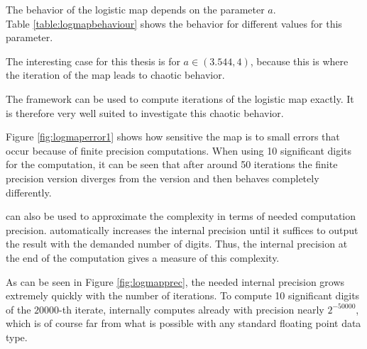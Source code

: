   The behavior of the logistic map depends on the parameter $a$.\\
  Table \ref{table:logmapbehaviour} shows the behavior for different values for this parameter.

  The interesting case for this thesis is for $a \in (3.544, 4)$, because this is  where the iteration of the map leads to chaotic behavior.

  The \irram framework can be used to compute iterations of the logistic map exactly. It is therefore very well suited to investigate this chaotic behavior.
  
  Figure \ref{fig:logmaperror1} shows how sensitive the map is to small errors that occur because of finite precision computations. 
  When using 10 significant digits for the computation, it can be seen that after around 50 iterations the finite precision version diverges from the \irram version and then behaves completely differently. 

  \irram can also be used to approximate the complexity in terms of needed computation precision. 
  \irram automatically increases the internal precision until it suffices to output the result with the demanded number of digits.
  Thus, the internal precision at the end of the computation gives a measure of this complexity. 

  As can be seen in Figure \ref{fig:logmapprec}, the needed internal precision grows extremely quickly with the number of iterations.
  To compute 10 significant digits of the $20000$-th iterate, \irram internally computes already with precision nearly $2^{-50000}$, which is of course far from what is possible with any standard floating point data type.   

